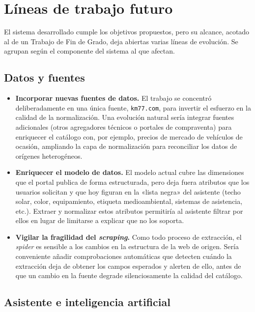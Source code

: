 \section{Líneas de trabajo futuro}
\label{sec:concl-futuro}

El sistema desarrollado cumple los objetivos propuestos, pero su alcance, acotado
al de un Trabajo de Fin de Grado, deja abiertas varias líneas de evolución. Se
agrupan según el componente del sistema al que afectan.

\subsection*{Datos y fuentes}

\begin{itemize}
  \item \textbf{Incorporar nuevas fuentes de datos.} El trabajo se concentró
        deliberadamente en una única fuente, \texttt{km77.com}, para invertir el
        esfuerzo en la calidad de la normalización. Una evolución natural sería
        integrar fuentes adicionales (otros agregadores técnicos o portales de
        compraventa) para enriquecer el catálogo con, por ejemplo, precios de
        mercado de vehículos de ocasión, ampliando la capa de normalización para
        reconciliar los datos de orígenes heterogéneos.

  \item \textbf{Enriquecer el modelo de datos.} El modelo actual cubre las
        dimensiones que el portal publica de forma estructurada, pero deja fuera
        atributos que los usuarios solicitan y que hoy figuran en la «lista negra»
        del asistente (techo solar, color, equipamiento, etiqueta medioambiental,
        sistemas de asistencia, etc.). Extraer y normalizar estos atributos
        permitiría al asistente filtrar por ellos en lugar de limitarse a explicar
        que no los soporta.

  \item \textbf{Vigilar la fragilidad del \emph{scraping}.} Como todo proceso de
        extracción, el \emph{spider} es sensible a los cambios en la estructura de
        la web de origen. Sería conveniente añadir comprobaciones automáticas que
        detecten cuándo la extracción deja de obtener los campos esperados y alerten
        de ello, antes de que un cambio en la fuente degrade silenciosamente la
        calidad del catálogo.
\end{itemize}

\subsection*{Asistente e inteligencia artificial}

